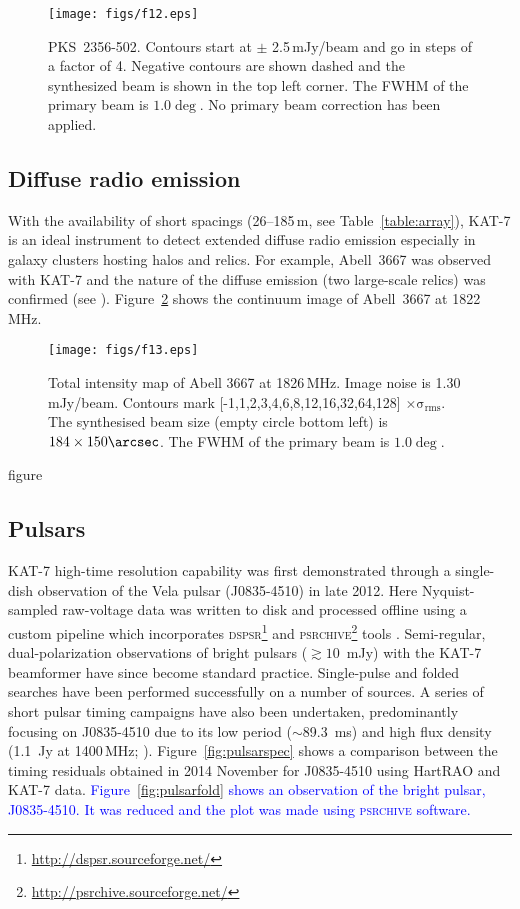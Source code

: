 \begin{figure}
\texttt{[image: figs/f12.eps]}
\caption{\mbox{PKS 2356-502}. Contours start at $\pm$ 2.5\,mJy/beam and go in
  steps of a factor of 4. Negative contours are shown dashed and the
  synthesized beam is shown in the top left corner. 
  The FWHM of the primary beam is $1.0\deg$. No primary beam
  correction has been applied. 
}
\label{fig:2326}
\end{figure}




\subsection{Diffuse radio emission}

\noindent
With the availability of short spacings (26--185\,m, see
Table~\ref{table:array}), KAT-7 is an ideal instrument to detect
extended diffuse radio emission especially in galaxy clusters hosting
halos and relics. For example, Abell~3667 was observed with KAT-7 and
the nature of the diffuse emission (two large-scale relics) was confirmed
(see \citealt{riseley}). 
Figure~\ref{fig:aco} shows the continuum image of
Abell~3667 at 1822\,MHz.


\begin{figure}
\texttt{[image: figs/f13.eps]}
\caption{Total intensity map of Abell 3667 at 1826\,MHz. Image noise
  is 1.30\,mJy/beam. Contours mark [-1,1,2,3,4,6,8,12,16,32,64,128]
  $\mathrm{\times \sigma_{rms}}$. The synthesised beam size (empty circle bottom left) is
  $\mathrm{184 \times 150 \arcsec}$.
  The FWHM of the primary beam is $\mathrm{1.0\deg}$.
  }
\label{fig:aco}
\end{figure}


figure \subsection{Pulsars}

\noindent


KAT-7 high-time resolution capability was first demonstrated through a
single-dish observation of the Vela pulsar (\mbox{J0835-4510}) in late
2012. Here Nyquist-sampled raw-voltage data was written to disk and
processed offline using a custom pipeline which incorporates
{\small\textsc{dspsr}}\footnote{\url{http://dspsr.sourceforge.net/}}
and
{\small\textsc{psrchive}}\footnote{\url{http://psrchive.sourceforge.net/}}
tools \citep{hotan}. Semi-regular, dual-polarization observations of
bright pulsars ($\gtrsim 10$~mJy) with the KAT-7 beamformer have since
become standard practice. Single-pulse and folded searches have been
performed successfully on a number of sources. A series of short
pulsar timing campaigns have also been undertaken, predominantly
focusing on \mbox{J0835-4510} due to its low period ($\sim$89.3~ms)
and high flux density (1.1~Jy at 1400\,MHz;
\citealt{bf74}). Figure~\ref{fig:pulsarspec} shows a comparison
between the timing residuals obtained in 2014 November for
\mbox{J0835-4510} using HartRAO and KAT-7 data.  \textcolor{blue}{
  Figure~\ref{fig:pulsarfold} shows an observation of the bright pulsar,
  \mbox{J0835-4510}. It was reduced and the plot was made using \textsc{psrchive}
  \citep{hotan} software.}

